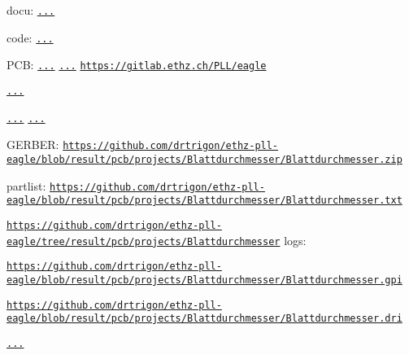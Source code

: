 docu\-: \href{https://rawgit.com/ethz-pll/Blattdurchmesser/result/docu/doc/html/index.html}{\tt ...}

code\-: \href{https://travis-ci.org/ethz-pll/Blattdurchmesser}{\tt ...}

P\-C\-B\-: \href{https://edrc.me/g/drtrigon/ethz-pll-eagle}{\tt ...} \href{https://travis-ci.org/drtrigon/ethz-pll-eagle}{\tt ...} \href{https://gitlab.ethz.ch/PLL/eagle}{\tt https\-://gitlab.\-ethz.\-ch/\-P\-L\-L/eagle}

 \href{https://github.com/drtrigon/ethz-pll-eagle/blob/result/pcb/projects/Blattdurchmesser/Blattdurchmesser_sch.png}{\tt ...}

\href{https://edrc.me/g/drtrigon/ethz-pll-eagle}{\tt ...}  \href{https://github.com/drtrigon/ethz-pll-eagle/blob/result/pcb/projects/Blattdurchmesser/Blattdurchmesser.png}{\tt ...}
\begin{DoxyItemize}
\item G\-E\-R\-B\-E\-R\-: \href{https://github.com/drtrigon/ethz-pll-eagle/blob/result/pcb/projects/Blattdurchmesser/Blattdurchmesser.zip}{\tt https\-://github.\-com/drtrigon/ethz-\/pll-\/eagle/blob/result/pcb/projects/\-Blattdurchmesser/\-Blattdurchmesser.\-zip}
\item partlist\-: \href{https://github.com/drtrigon/ethz-pll-eagle/blob/result/pcb/projects/Blattdurchmesser/Blattdurchmesser.txt}{\tt https\-://github.\-com/drtrigon/ethz-\/pll-\/eagle/blob/result/pcb/projects/\-Blattdurchmesser/\-Blattdurchmesser.\-txt}
\end{DoxyItemize}

\href{https://github.com/drtrigon/ethz-pll-eagle/tree/result/pcb/projects/Blattdurchmesser}{\tt https\-://github.\-com/drtrigon/ethz-\/pll-\/eagle/tree/result/pcb/projects/\-Blattdurchmesser} logs\-:
\begin{DoxyItemize}
\item \href{https://github.com/drtrigon/ethz-pll-eagle/blob/result/pcb/projects/Blattdurchmesser/Blattdurchmesser.gpi}{\tt https\-://github.\-com/drtrigon/ethz-\/pll-\/eagle/blob/result/pcb/projects/\-Blattdurchmesser/\-Blattdurchmesser.\-gpi}
\item \href{https://github.com/drtrigon/ethz-pll-eagle/blob/result/pcb/projects/Blattdurchmesser/Blattdurchmesser.dri}{\tt https\-://github.\-com/drtrigon/ethz-\/pll-\/eagle/blob/result/pcb/projects/\-Blattdurchmesser/\-Blattdurchmesser.\-dri}
\end{DoxyItemize}

 \href{https://github.com/drtrigon/ethz-pll-eagle/blob/result/pcb/projects/Blattdurchmesser/Blattdurchmesser_auto.png}{\tt ...}

